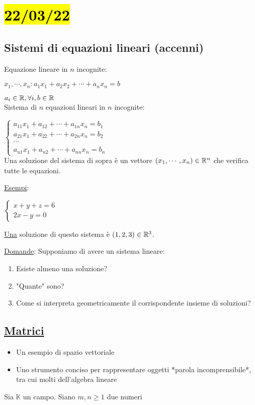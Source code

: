 \documentclass{article}
\begin{document}
\section{\hl{22/03/22}}
\subsection*{Sistemi di equazioni lineari (accenni)}
Equazione lineare in $n$ incognite:

$x_1,\cdots,x_n: a_1x_1+a_2x_2+\cdots+a_nx_n=b$

$a_i\in\mathbb{R},\forall i,b\in\mathbb{R}$\\
Sistema di $n$ equazioni lineari in $n$ incognite:

$\begin{cases}
		a_{11}x_1+a_{12}+\cdots+a_{1n}x_n=b_1 \\
		a_{21}x_1+a_{22}+\cdots+a_{2n}x_n=b_2 \\
		\cdots                                \\
		a_{n1}x_1+a_{n2}+\cdots+a_{nn}x_n=b_n
	\end{cases}$\\

Una soluzione del sistema di sopra è un vettore $(x_1,\cdots,x_n)\in\mathbb{R}^n$ che verifica tutte le equazioni.

\ul{Esempi}:\vspace*{1em}

$\begin{cases}x+y+z=6\\2x-y=0\end{cases}$\vspace*{1em}

\ul{Una} soluzione di questo sistema è $(1,2,3)\in\mathbb{R}^3$.\vspace*{1em}

\ul{Domande}: Supponiamo di avere un sistema lineare:
\begin{enumerate}
	\item Esiste almeno una soluzione?
	\item "Quante" sono?
	\item Come si interpreta geometricamente il corrispondente insieme di soluzioni?
\end{enumerate}
\subsection*{\ul{Matrici}}
\begin{itemize}
	\item Un esempio di spazio vettoriale
	\item Uno strumento conciso per rappresentare oggetti *parola incomprensibile*, tra cui molti dell'algebra lineare
\end{itemize}
Sia $\mathbb{K}$ un campo.
Siano $m,n\ge1$ due numeri
\end{document}
